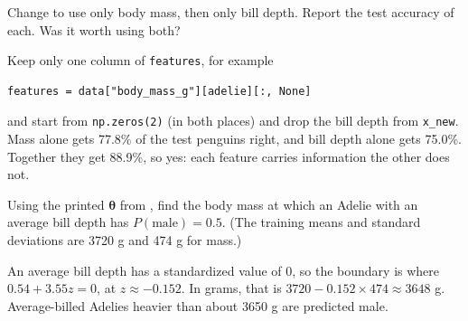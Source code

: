 \begin{Exercise}[label=mlog4, title={One feature at a time}]
Change  to use only body mass, then only bill depth. Report the test accuracy of each.
Was it worth using both?
\end{Exercise}
\begin{Answer}[ref=mlog4]
Keep only one column of \verb|features|, for example
\begin{verbatim}
features = data["body_mass_g"][adelie][:, None]
\end{verbatim}
and start from \verb|np.zeros(2)| (in both places) and drop the bill depth from \verb|x_new|. Mass alone gets
77.8\% of the test penguins right, and bill depth alone gets 75.0\%. Together they get 88.9\%, so yes: each
feature carries information the other does not.
\end{Answer}

\begin{Exercise}[label=mlog5, title={Where is the line?}]
Using the printed $\boldsymbol{\theta}$ from , find the body mass at which an Adelie with
an average bill depth has $P(\text{male}) = 0.5$. (The training means and standard deviations are 3720 g and
474 g for mass.)
\end{Exercise}
\begin{Answer}[ref=mlog5]
An average bill depth has a standardized value of 0, so the boundary is where $0.54 + 3.55z = 0$, at
$z \approx -0.152$. In grams, that is $3720 - 0.152 \times 474 \approx 3648$ g. Average-billed Adelies heavier
than about 3650 g are predicted male.
\end{Answer}
